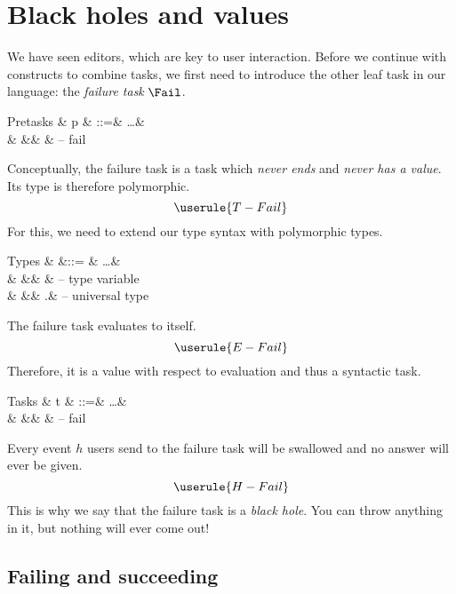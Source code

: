 
\section{Black holes and values}

We have seen editors,
which are key to user interaction.
Before we continue with constructs to combine tasks,
we first need to introduce the other leaf task in our language:
the \emph{failure task} $\Fail$.

\begin{grammar}
  Pretasks
    & p & ::=& \ldots & \\
    &   &\mid& \Fail  & – fail \\
\end{grammar}
Conceptually,
the failure task is a task which \emph{never ends} and \emph{never has a value}.
Its type is therefore polymorphic.
\begin{equation*}
  \userule{T-Fail}
\end{equation*}
For this,
we need to extend our type syntax with polymorphic types.
\begin{grammar}
  Types
    & \tau &::= & \ldots             & \\
    &      &\mid& \alpha             & – type variable \\
    &      &\mid& \forall\alpha.\tau & – universal type \\
\end{grammar}

The failure task evaluates to itself.
\begin{equation*}
  \userule{E-Fail}
\end{equation*}
Therefore,
it is a value with respect to evaluation and thus a syntactic task.
\begin{grammar}
  Tasks
    & t & ::=& \ldots & \\
    &   &\mid& \Fail  & – fail \\
\end{grammar}

Every event $h$ users send to the failure task will be swallowed
and no answer will ever be given.
\begin{equation*}
  \userule{H-Fail}
\end{equation*}
This is why we say that the failure task is a \emph{black hole}.
You can throw anything in it,
but nothing will ever come out!


\subsection{Failing and succeeding}
\label{sec:succeeding}

